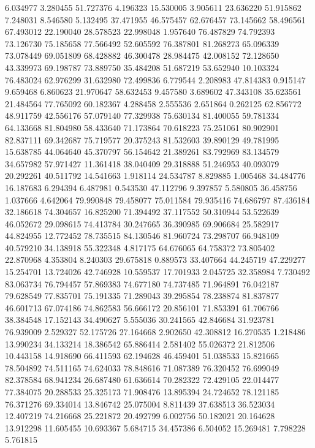 6.034977
3.280455
51.727376
4.196323
15.530005
3.905611
23.636220
51.915862
7.248031
8.546580
5.132495
37.471955
46.575457
62.676457
73.145662
58.496561
67.493012
22.190040
28.578523
22.998048
1.957640
76.487829
74.792393
73.126730
75.185658
77.566492
52.605592
76.387801
81.268273
65.096339
73.078449
69.051809
68.428882
46.300478
28.984475
42.008152
72.128650
43.339973
69.198787
73.889750
35.484208
51.687219
53.652940
10.103324
76.483024
62.976299
31.632980
72.499836
6.779544
2.208983
47.814383
0.915147
9.659468
6.860623
21.970647
58.632453
9.457580
3.689602
47.343108
35.623561
21.484564
77.765092
60.182367
4.288458
2.555536
2.651864
0.262125
62.856772
48.911759
42.556176
57.079140
77.329938
75.630134
81.400055
59.781334
64.133668
81.804980
58.433640
71.173864
70.618223
75.251061
80.902901
82.837111
69.342687
75.719577
20.375243
81.532603
39.890129
49.781995
15.638785
44.064640
45.370797
56.154642
21.389261
83.792969
83.134579
34.657982
57.971427
11.361418
38.040409
29.318888
51.246953
40.093079
20.292261
40.511792
14.541663
1.918114
24.534787
8.829885
1.005468
34.484776
16.187683
6.294394
6.487981
0.543530
47.112796
9.397857
5.580805
36.458756
1.037666
4.642064
79.990848
79.458077
75.011584
79.935416
74.686797
87.436184
32.186618
74.304657
16.825200
71.394492
37.117552
50.310944
53.522639
46.052672
29.098615
74.413784
30.247665
36.390985
69.906684
25.582917
44.824955
12.772452
78.735515
84.130546
81.960724
73.298707
66.948109
40.579210
34.138918
55.322348
4.817175
64.676065
64.758372
73.805402
22.870968
4.353804
8.240303
29.675818
0.889573
33.407664
44.245719
47.229277
15.254701
13.724026
42.746928
10.559537
17.701933
2.045725
32.358984
7.730492
83.063734
76.794457
57.869383
74.677180
74.737485
71.964891
76.042187
79.628549
77.835701
75.191335
71.289043
39.295854
78.238874
81.837877
46.601713
67.074186
74.862583
56.666172
20.856101
71.853391
61.706766
38.384548
17.152143
34.490627
5.555036
30.241565
42.846684
31.923781
76.939009
2.529327
52.175726
27.164668
2.902650
42.308812
16.270535
1.218486
13.990234
34.133214
18.386542
65.886414
2.581402
55.026372
21.812506
10.443158
14.918690
66.411593
62.194628
46.459401
51.038533
15.821665
78.504892
74.511165
74.624033
78.848616
71.087389
76.320452
76.699049
82.378584
68.941234
26.687480
61.636614
70.282322
72.429105
22.014477
77.384075
20.288533
25.325173
71.908476
13.895394
24.724652
78.121185
76.371276
69.334014
13.846742
25.075004
8.811439
37.638513
36.523034
12.407219
74.216668
25.221872
20.492799
6.002756
50.182021
20.164628
13.912298
11.605455
10.693367
5.684715
34.457386
6.504052
15.269481
7.798228
5.761815
